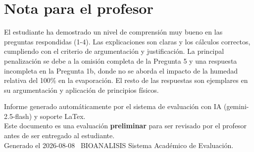 \documentclass[11pt,a4paper]{article}
\begin{document}
\section*{Nota para el profesor}
\begin{tcolorbox}[
  enhanced, breakable,
  colback=yellow!8, colframe=yellow!60!black,
  fonttitle=\bfseries, coltitle=black,
  title={Observaciones para revisión manual},
  top=4pt, bottom=4pt, left=8pt, right=8pt,
]
El estudiante ha demostrado un nivel de comprensión muy bueno en las preguntas respondidas (1-4). Las explicaciones son claras y los cálculos correctos, cumpliendo con el criterio de argumentación y justificación. La principal penalización se debe a la omisión completa de la Pregunta 5 y una respuesta incompleta en la Pregunta 1b, donde no se aborda el impacto de la humedad relativa del 100\% en la evaporación. El resto de las respuestas son ejemplares en su argumentación y aplicación de principios físicos.
\end{tcolorbox}

\vspace{12pt}
\begin{center}
  \footnotesize\color{gray}
  Informe generado automáticamente por el sistema de evaluación con IA (gemini-2.5-flash) y soporte LaTex. \\
  Este documento es una evaluación \textbf{preliminar} para ser revisado por el profesor antes de ser entregado al 
  estudiante. \\
  Generado el 2026-08-08 \textbullet\ BIOANALISIS Sistema Académico de Evaluación.
  \end{center}
\end{document}
